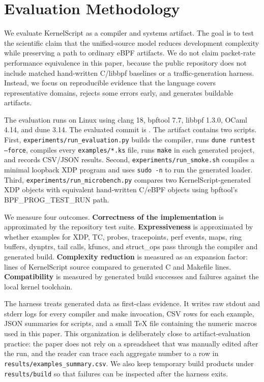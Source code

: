 \documentclass[10pt,twocolumn]{article}
\newcommand{\tool}{KernelScript}
\begin{document}
\section{Evaluation Methodology}

We evaluate \tool{} as a compiler and systems artifact.  The goal is to test
the scientific claim that the unified-source model reduces development
complexity while preserving a path to ordinary eBPF artifacts.  We do not claim
packet-rate performance equivalence in this paper, because the public
repository does not include matched hand-written C/libbpf baselines or a
traffic-generation harness.  Instead, we focus on reproducible evidence that
the language covers representative domains, rejects some errors early, and
generates buildable artifacts.

The evaluation runs on Linux \KSKernelVersion{} using clang 18, bpftool 7.7,
libbpf 1.3.0, OCaml 4.14, and dune 3.14.  The evaluated commit is
\KSCommitShort{}.  The artifact contains two scripts.  First,
\texttt{experiments/run\_evaluation.py} builds the compiler, runs
\texttt{dune runtest --force}, compiles every \texttt{examples/*.ks} file,
runs \texttt{make} in each generated project, and records CSV/JSON results.
Second, \texttt{experiments/run\_smoke.sh} compiles a minimal loopback XDP
program and uses \texttt{sudo -n} to run the generated loader.  Third,
\texttt{experiments/run\_microbench.py} compares two KernelScript-generated
XDP objects with equivalent hand-written C/eBPF objects using bpftool's
BPF\_PROG\_TEST\_RUN path.

We measure four outcomes.  \textbf{Correctness of the implementation} is
approximated by the repository test suite.  \textbf{Expressiveness} is
approximated by whether examples for XDP, TC, probes, tracepoints, perf events,
maps, ring buffers, dynptrs, tail calls, kfuncs, and struct\_ops pass through
the compiler and generated build.  \textbf{Complexity reduction} is measured
as an expansion factor: lines of \tool{} source compared to generated C and
Makefile lines.  \textbf{Compatibility} is measured by generated build
successes and failures against the local kernel toolchain.

The harness treats generated data as first-class evidence.  It writes raw
stdout and stderr logs for every compiler and make invocation, CSV rows for
each example, JSON summaries for scripts, and a small TeX file containing the
numeric macros used in this paper.  This organization is deliberately close to
artifact-evaluation practice: the paper does not rely on a spreadsheet that
was manually edited after the run, and the reader can trace each aggregate
number to a row in \texttt{results/examples\_summary.csv}.  We also keep
temporary build products under \texttt{results/build} so that failures can be
inspected after the harness exits.
\end{document}

